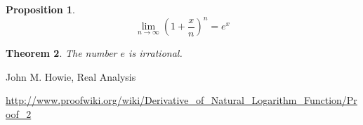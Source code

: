 \documentclass[12pt]{article}
\theoremstyle{mystyle}
\newtheorem{thm}{Theorem}
\newtheorem{prop}[thm]{Proposition}
\begin{document}
\begin{prop}
  $$ \lim_{n \to \infty} \left( 1 + \frac{x}{n} \right)^n = e^x $$
\end{prop}


\begin{thm}
  The number $e$ is irrational. 
\end{thm}



\begin{thebibliography}{10}

John M. Howie, Real Analysis

\url{http://www.proofwiki.org/wiki/Derivative_of_Natural_Logarithm_Function/Proof_2}

\end{thebibliography}
\end{document}
